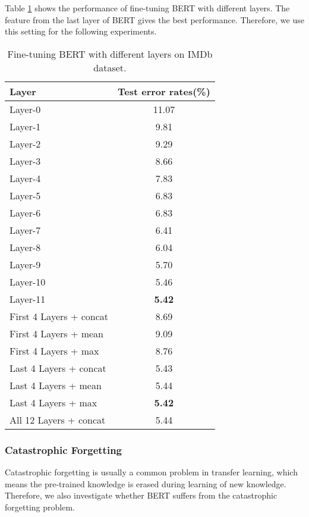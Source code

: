\documentclass[11pt,a4paper]{article}
\theoremstyle{definition}
\begin{document}
\begin{CJK*}{UTF8}{gbsn}
Table \ref{tb:layers} shows the performance of fine-tuning BERT with different layers. The feature from the last layer of BERT gives the best performance. Therefore, we use this setting for the following experiments.





\begin{table}[h!]\small
\centering
\begin{tabular}{l c}
	\toprule
	Layer & Test error rates(\%) \\
	\midrule
	Layer-0 & 11.07 \\
	Layer-1 & 9.81 \\
	Layer-2 & 9.29 \\
	Layer-3 & 8.66 \\
	Layer-4 & 7.83 \\
	Layer-5 & 6.83 \\
	Layer-6 & 6.83 \\
	Layer-7 & 6.41 \\
	Layer-8 & 6.04 \\
	Layer-9 & 5.70 \\
	Layer-10 & 5.46 \\
	Layer-11 & \textbf{5.42} \\
	\midrule
	First 4 Layers + concat & 8.69 \\
	First 4 Layers + mean & 9.09 \\
	First 4 Layers + max & 8.76 \\
	\midrule
	Last 4 Layers + concat & 5.43 \\
	Last 4 Layers + mean & 5.44 \\
	Last 4 Layers + max & \textbf{5.42} \\
	\midrule
	All 12 Layers + concat & 5.44 \\
	\bottomrule
\end{tabular}
\caption{Fine-tuning BERT with different layers on IMDb dataset.
}\label{tb:layers}
\end{table}




\subsubsection{Catastrophic Forgetting}
Catastrophic forgetting \cite{mccloskey1989catastrophic} is usually a common problem in transfer learning, which means the pre-trained knowledge is erased during learning of new knowledge. Therefore, we also investigate whether BERT suffers from the catastrophic forgetting problem.


\end{CJK*}
\end{document}
